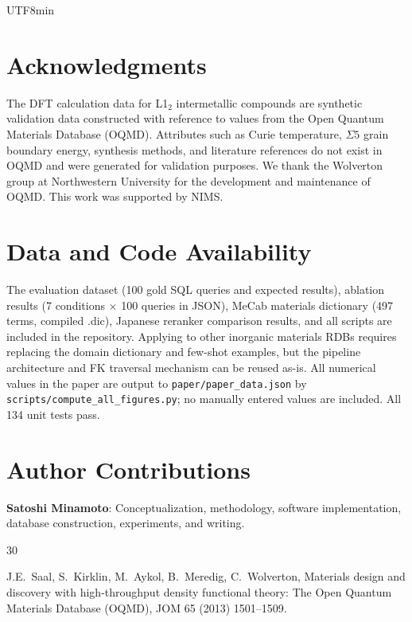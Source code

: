 \documentclass[sn-mathphys,Numbered]{sn-jnl}
\begin{document}
\begin{CJK}{UTF8}{min}
\section*{Acknowledgments}

The DFT calculation data for L1$_2$ intermetallic compounds are
synthetic validation data constructed with reference to values from
the Open Quantum Materials Database (OQMD).
Attributes such as Curie temperature, $\Sigma 5$ grain boundary
energy, synthesis methods, and literature references do not exist
in OQMD and were generated for validation purposes.
We thank the Wolverton group at Northwestern University for the
development and maintenance of OQMD.
This work was supported by NIMS.

\section*{Data and Code Availability}

The evaluation dataset (100 gold SQL queries and expected results),
ablation results (7 conditions $\times$ 100 queries in JSON),
MeCab materials dictionary (497 terms, compiled .dic),
Japanese reranker comparison results, and all scripts are included
in the repository.
Applying to other inorganic materials RDBs requires replacing the
domain dictionary and few-shot examples, but the pipeline
architecture and FK traversal mechanism can be reused as-is.
All numerical values in the paper are output to
\texttt{paper/paper\_data.json} by
\texttt{scripts/compute\_all\_figures.py}; no manually entered
values are included.
All 134 unit tests pass.

\section*{Author Contributions}

\textbf{Satoshi Minamoto}: Conceptualization, methodology, software
implementation, database construction, experiments, and writing.

\begin{thebibliography}{30}

J.E.~Saal, S.~Kirklin, M.~Aykol, B.~Meredig, C.~Wolverton,
Materials design and discovery with high-throughput density functional theory: {The Open Quantum Materials Database (OQMD)},
JOM 65 (2013) 1501--1509.


\end{thebibliography}
\end{CJK}
\end{document}
